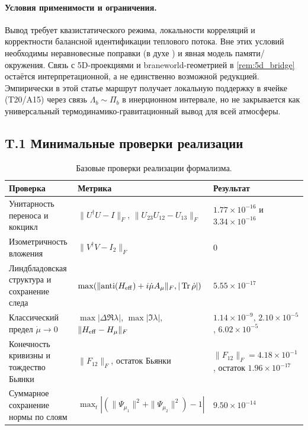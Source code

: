 \documentclass[11pt,a4paper]{article}
\DeclareMathOperator{\Tr}{Tr}
\theoremstyle{definition}
\theoremstyle{plain}
\theoremstyle{remark}
\begin{document}
\paragraph{Условия применимости и ограничения.}
Вывод требует квазистатического режима, локальности корреляций и корректности балансной идентификации теплового потока.
Вне этих условий необходимы неравновесные поправки (в духе \cite{ElingGuedensJacobson2009NonEq}) и явная модель памяти/окружения.
Связь с 5D-проекциями и braneworld-геометрией в \cref{rem:5d_bridge} остаётся интерпретационной,
а не единственно возможной редукцией.
Эмпирически в этой статье маршрут получает локальную поддержку в ячейке (T20/A15) через связь \(\Lambda_b\sim\Pi_b\) в инерционном интервале, но не закрывается как универсальный термодинамико-гравитационный вывод для всей атмосферы.

\subsection*{T.1 Минимальные проверки реализации}

\begin{table}[H]
\centering
\caption{Базовые проверки реализации формализма.}
\label{tab:appendix_t_impl}
\small
\begin{tabular}{@{}p{4.8cm}p{4.1cm}p{5.1cm}@{}}
\toprule
Проверка & Метрика & Результат \\
\midrule
Унитарность переноса и кокцикл & $\|U^\dagger U-I\|_F$, $\|U_{23}U_{12}-U_{13}\|_F$ & $1.77\times10^{-16}$ и $3.34\times10^{-16}$ \\
Изометричность вложения & $\|V^\dagger V-I_2\|_F$ & $0$ \\
Линдбладовская структура и сохранение следа & $\max(\|{\rm anti}(H_{\rm eff})+i\dot\mu A_\mu\|_F,|\Tr\dot\rho|)$ & $5.55\times10^{-17}$ \\
Классический предел $\dot\mu\to 0$ & $\max|\Delta\Re\lambda|$, $\max|\Im\lambda|$, $\|H_{\rm eff}-H_\mu\|_F$ & $1.14\times10^{-9}$, $2.10\times10^{-5}$, $6.02\times10^{-5}$ \\
Конечность кривизны и тождество Бьянки & $\|F_{12}\|_F$, остаток Бьянки & $\|F_{12}\|_F=4.18\times10^{-1}$, остаток $1.96\times10^{-17}$ \\
Суммарное сохранение нормы по слоям & $\max_t|(\|\Psi_{\mu_1}\|^2+\|\Psi_{\mu_2}\|^2)-1|$ & $9.50\times10^{-14}$ \\
\bottomrule
\end{tabular}
\end{table}
\end{document}
